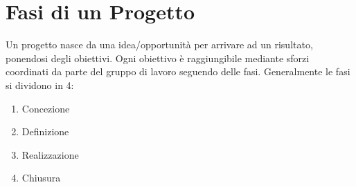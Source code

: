 \documentclass{article}
\begin{document}
\section{Fasi di un Progetto}
Un progetto nasce da una idea/opportunità per arrivare ad un risultato, ponendosi degli obiettivi.
Ogni obiettivo è raggiungibile mediante sforzi coordinati da parte del gruppo di lavoro seguendo delle fasi.
Generalmente le fasi si dividono in 4:

\begin{enumerate}
\item Concezione
\item Definizione
\item Realizzazione
\item Chiusura	
\end{enumerate}
\end{document}
